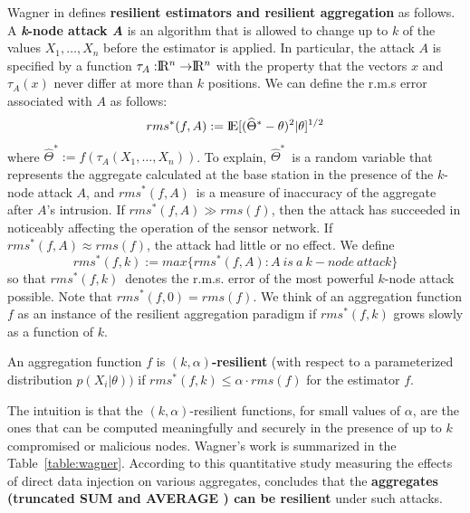 	Wagner in \cite{wagner2004resilient} defines \textbf{resilient estimators and resilient aggregation } as follows.
	A \textbf{\textit{k}-node attack \textit{A}} is an algorithm that is allowed to change up to $k$ of the values $X_{1}, \dotsc, X_{n}$ before the estimator is applied.
	In particular, the attack $A$ is specified by a function $\tau_{A} : \R^n \rightarrow  \R^n $ with the property that the vectors $x$ and $\tau_{A}(x)$ never differ at more than $k$ positions.
	We can define the r.m.s error associated with $A$ as follows:
	\begin{equation}
		rms^*(f,A) := \rm I\!E[(\widehat{\Theta}^* - \theta)^2 | \theta]^{1/2} 		  
	\end{equation}
	where $\widehat{\Theta}^* := f(\tau_{A}(X_{1},\dotsc,X_{n}))$.
	To explain, $\widehat{\Theta}^*$\ is a random variable that represents the aggregate calculated at the base station in the presence of the $k$-node attack $A$, and $rms^*(f,A)$\ is a measure of inaccuracy of the aggregate after $A$'s intrusion.
	If $rms^*(f,A) \gg rms(f)$, then the attack has succeeded in noticeably affecting the operation of the sensor network.
	If $rms^*(f,A) \approx rms(f)$, the attack had little or no effect.
	We define
	\begin{equation}
		rms^*(f,k) := max\{rms^*(f,A): A\ is\ a\ k-node\ attack\}
	\end{equation}
	so that $rms^*(f,k)$\ denotes the r.m.s. error of the most powerful
	$k$-node attack possible. 
	Note that $rms^* (f, 0) = rms(f)$.
	We think of an aggregation function $f$ as an instance of the resilient aggregation paradigm if $rms^* (f, k)$ grows slowly as a function of $k$.
	\begin{definition}
		\cite{wagner2004resilient} An aggregation function $f$ is \textbf{$(k, \alpha)$-resilient} (with respect to a parameterized distribution $p(X_{i} | \theta))$ if $rms^*(f, k) \le \alpha \cdot rms(f)$ for the estimator $f$.
		\label{def:resilient}
	\end{definition}
	The intuition is that the $(k, \alpha)$-resilient functions, for small values of $\alpha$, are the ones that can be computed meaningfully and securely in the presence of up to $k$ compromised or malicious nodes.
	Wagner's work is summarized in the Table~\ref{table:wagner}.
	According to this quantitative study measuring the effects of direct data injection on various aggregates, concludes that the \textbf{aggregates (truncated SUM and AVERAGE ) can be resilient} under such attacks.
